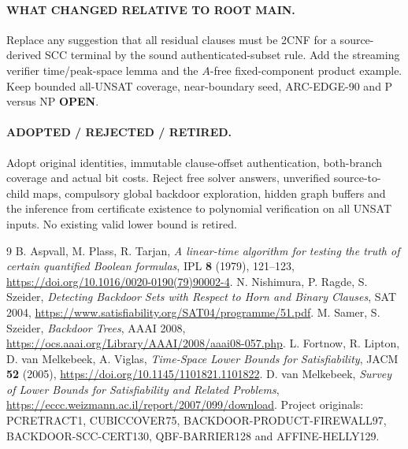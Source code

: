 \documentclass[11pt]{article}
\begin{document}
\paragraph{WHAT CHANGED RELATIVE TO ROOT MAIN.}
Replace any suggestion that all residual clauses must be 2CNF for a source-derived SCC terminal by the sound authenticated-subset rule. Add the streaming verifier time/peak-space lemma and the $A$-free fixed-component product example. Keep bounded all-UNSAT coverage, near-boundary seed, ARC-EDGE-90 and P versus NP \textbf{OPEN}.

\paragraph{ADOPTED / REJECTED / RETIRED.}
Adopt original identities, immutable clause-offset authentication, both-branch coverage and actual bit costs. Reject free solver answers, unverified source-to-child maps, compulsory global backdoor exploration, hidden graph buffers and the inference from certificate existence to polynomial verification on all UNSAT inputs. No existing valid lower bound is retired.

\begin{thebibliography}{9}
 B. Aspvall, M. Plass, R. Tarjan, \emph{A linear-time algorithm for testing the truth of certain quantified Boolean formulas}, IPL \textbf{8} (1979), 121--123, \url{https://doi.org/10.1016/0020-0190(79)90002-4}.
 N. Nishimura, P. Ragde, S. Szeider, \emph{Detecting Backdoor Sets with Respect to Horn and Binary Clauses}, SAT 2004, \url{https://www.satisfiability.org/SAT04/programme/51.pdf}.
 M. Samer, S. Szeider, \emph{Backdoor Trees}, AAAI 2008, \url{https://ocs.aaai.org/Library/AAAI/2008/aaai08-057.php}.
 L. Fortnow, R. Lipton, D. van Melkebeek, A. Viglas, \emph{Time-Space Lower Bounds for Satisfiability}, JACM \textbf{52} (2005), \url{https://doi.org/10.1145/1101821.1101822}.
 D. van Melkebeek, \emph{Survey of Lower Bounds for Satisfiability and Related Problems}, \url{https://eccc.weizmann.ac.il/report/2007/099/download}.
 Project originals: PCRETRACT1, CUBICCOVER75, BACKDOOR-PRODUCT-FIREWALL97, BACKDOOR-SCC-CERT130, QBF-BARRIER128 and AFFINE-HELLY129.
\end{thebibliography}
\end{document}
